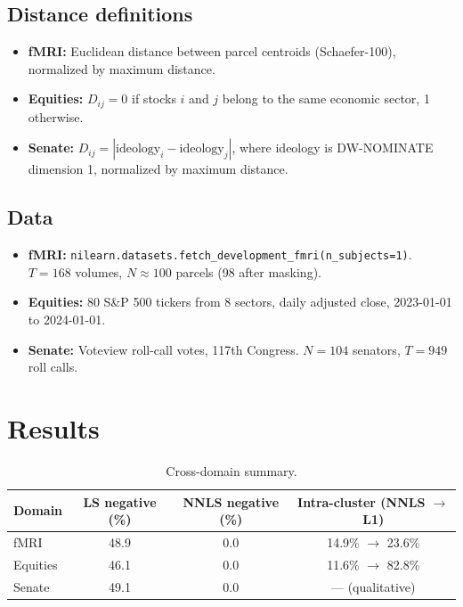 \documentclass[11pt,a4paper]{article}
\begin{document}
\subsection{Distance definitions}
\begin{itemize}
    \item \textbf{fMRI:} Euclidean distance between parcel centroids (Schaefer-100), normalized by maximum distance.
    \item \textbf{Equities:} $D_{ij} = 0$ if stocks $i$ and $j$ belong to the same economic sector, 1 otherwise.
    \item \textbf{Senate:} $D_{ij} = |\text{ideology}_i - \text{ideology}_j|$, where ideology is DW-NOMINATE dimension 1, normalized by maximum distance.
\end{itemize}

\subsection{Data}
\begin{itemize}
    \item \textbf{fMRI:} \texttt{nilearn.datasets.fetch\_development\_fmri(n\_subjects=1)}. $T=168$ volumes, $N\approx 100$ parcels (98 after masking).
    \item \textbf{Equities:} 80 S\&P 500 tickers from 8 sectors, daily adjusted close, 2023-01-01 to 2024-01-01.
    \item \textbf{Senate:} Voteview roll-call votes, 117th Congress. $N = 104$ senators, $T = 949$ roll calls.
\end{itemize}

\section{Results}

\begin{table}[h]
\centering
\begin{tabular}{@{}lccc@{}}
\toprule
\textbf{Domain} & \textbf{LS negative (\%)} & \textbf{NNLS negative (\%)} & \textbf{Intra-cluster (NNLS $\rightarrow$ L1)} \\
\midrule
fMRI & 48.9 & 0.0 & 14.9\% $\rightarrow$ 23.6\% \\
Equities & 46.1 & 0.0 & 11.6\% $\rightarrow$ 82.8\% \\
Senate & 49.1 & 0.0 & --- (qualitative) \\
\bottomrule
\end{tabular}
\caption{Cross-domain summary.}
\label{tab:summary}
\end{table}
\end{document}
